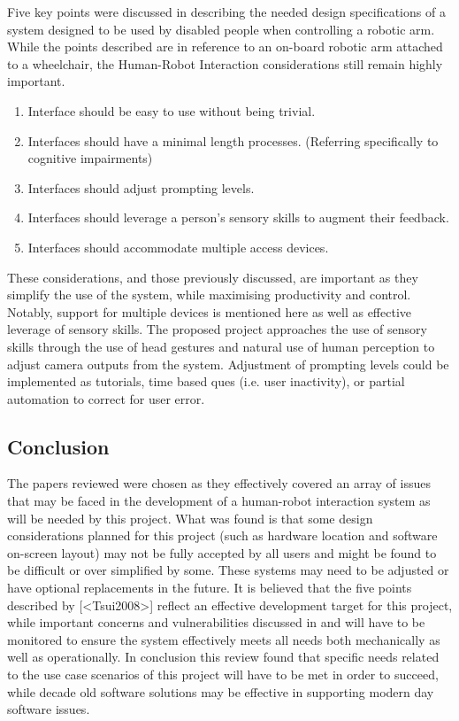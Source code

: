 \documentclass[11pt]{article} %
\begin{document}
Five key points were discussed in \cite{Tsui2008} describing the needed design specifications of a system designed to be used by disabled people when controlling a robotic arm.
While the points described are in reference to an on-board robotic arm attached to a wheelchair, the Human-Robot Interaction considerations still remain highly important.
\begin{enumerate}
\item Interface should be easy to use without being trivial.
\item Interfaces should have a minimal length processes. (Referring specifically to cognitive impairments)
\item Interfaces should adjust prompting levels. 
\item Interfaces should leverage a person's sensory skills to augment their feedback.
\item Interfaces should accommodate multiple access devices.
\end{enumerate}
These considerations, and those previously discussed, are important as they simplify the use of the system, while maximising productivity and control. Notably, support for multiple devices is mentioned here as well as effective leverage of sensory skills. The proposed project approaches the use of sensory skills through the use of head gestures and natural use of human perception to adjust camera outputs from the system. Adjustment of prompting levels could be implemented as tutorials, time based ques (i.e. user inactivity), or partial automation to correct for user error.

\subsection{Conclusion}
The papers reviewed were chosen as they effectively covered an array of issues that may be faced in the development of a human-robot interaction system as will be needed by this project.
What was found is that some design considerations planned for this project (such as hardware location and software on-screen layout) may not be fully accepted by all users and might be found to be difficult or over simplified by some. These systems may need to be adjusted or have optional replacements in the future.
It is believed that the five points described by [<Tsui2008>] reflect an effective development target for this project, while important concerns and vulnerabilities discussed in \cite{tsui2007simplifying} and \cite{goldberg1995desktop} will have to be monitored to ensure the system effectively meets all needs both mechanically as well as operationally.
In conclusion this review found that specific needs related to the use case scenarios of this project will have to be met in order to succeed, while decade old software solutions may be effective in supporting modern day software issues.     
\end{document}
